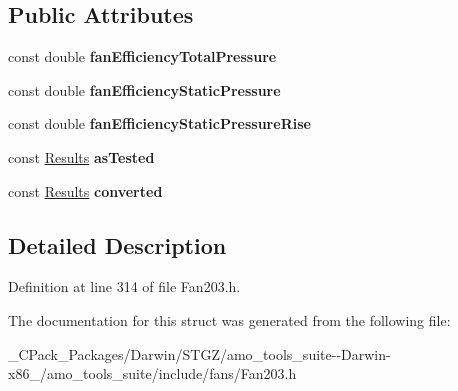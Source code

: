 \subsection*{Public Attributes}
\begin{DoxyCompactItemize}
\item 
\mbox{\label{struct_fan203_1_1_output_a1c693f72537a3b09c5675e9597582b99}} 
const double {\bfseries fan\+Efficiency\+Total\+Pressure}
\item 
\mbox{\label{struct_fan203_1_1_output_a3ed8a45f96d2c0d59f5c4780dfa706f5}} 
const double {\bfseries fan\+Efficiency\+Static\+Pressure}
\item 
\mbox{\label{struct_fan203_1_1_output_a65e4c8f90e87720f09f5691a75ef34b8}} 
const double {\bfseries fan\+Efficiency\+Static\+Pressure\+Rise}
\item 
\mbox{\label{struct_fan203_1_1_output_a82901834cabb87e119d0b1186a06aeae}} 
const \hyperlink{struct_fan203_1_1_results}{Results} {\bfseries as\+Tested}
\item 
\mbox{\label{struct_fan203_1_1_output_a775ac959a1b54c2cdb2eb695fcb3ace3}} 
const \hyperlink{struct_fan203_1_1_results}{Results} {\bfseries converted}
\end{DoxyCompactItemize}


\subsection{Detailed Description}


Definition at line 314 of file Fan203.\+h.



The documentation for this struct was generated from the following file\+:\begin{DoxyCompactItemize}
\item 
\+\_\+\+C\+Pack\+\_\+\+Packages/\+Darwin/\+S\+T\+G\+Z/amo\+\_\+tools\+\_\+suite-\/-\/\+Darwin-\/x86\+\_/amo\+\_\+tools\+\_\+suite/include/fans/Fan203.\+h\end{DoxyCompactItemize}
